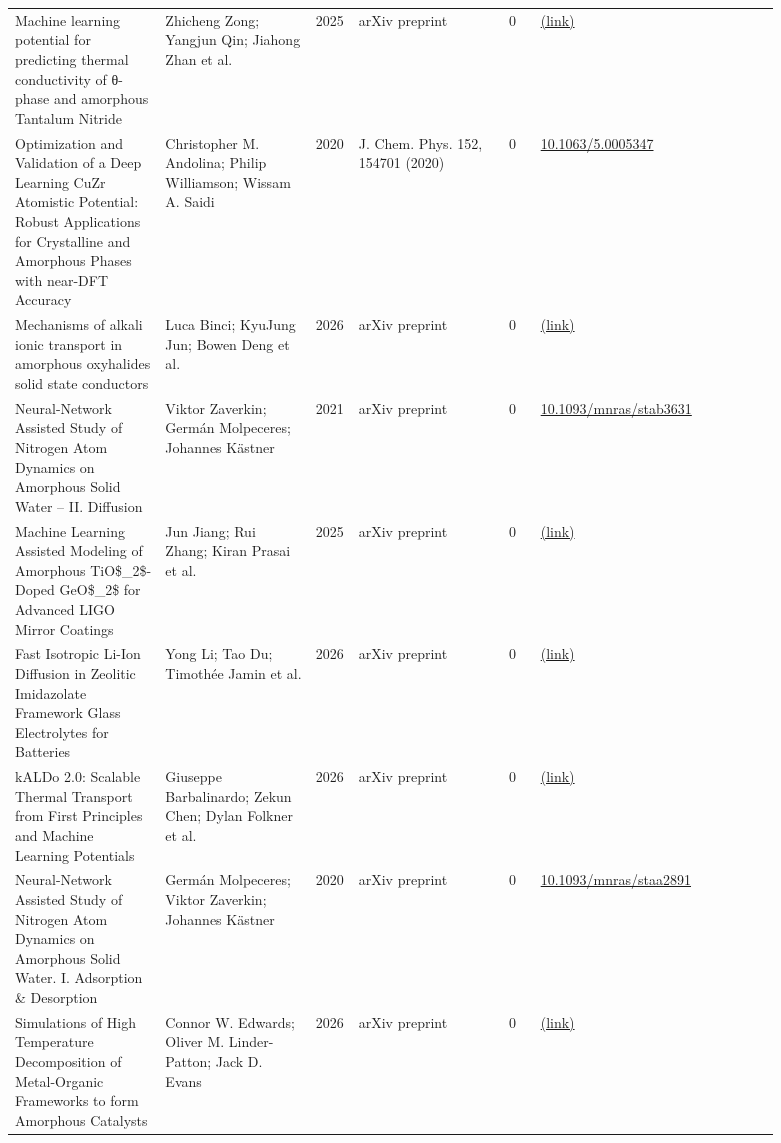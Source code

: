 \documentclass[10pt,a4paper]{article}
\begin{document}
{\begin{longtable}{p{0.192\linewidth}p{0.192\linewidth}p{0.043\linewidth}p{0.192\linewidth}p{0.043\linewidth}p{0.132\linewidth}p{0.096\linewidth}}
Machine learning potential for predicting thermal conductivity of θ-phase and amorphous Tantalum Nitride & Zhicheng Zong; Yangjun Qin; Jiahong Zhan et al. & 2025 & arXiv preprint & 0 & \href{http://arxiv.org/abs/2508.03297v1}{(link)} &  \\
Optimization and Validation of a Deep Learning CuZr Atomistic Potential: Robust Applications for Crystalline and Amorphous Phases with near-DFT Accuracy & Christopher M. Andolina; Philip Williamson; Wissam A. Saidi & 2020 & J. Chem. Phys. 152, 154701 (2020) & 0 & \href{https://doi.org/10.1063/5.0005347}{10.1063/5.0005347} &  \\
Mechanisms of alkali ionic transport in amorphous oxyhalides solid state conductors & Luca Binci; KyuJung Jun; Bowen Deng et al. & 2026 & arXiv preprint & 0 & \href{http://arxiv.org/abs/2601.06384v1}{(link)} &  \\
Neural-Network Assisted Study of Nitrogen Atom Dynamics on Amorphous Solid Water -- II. Diffusion & Viktor Zaverkin; Germán Molpeceres; Johannes Kästner & 2021 & arXiv preprint & 0 & \href{https://doi.org/10.1093/mnras/stab3631}{10.1093/mnras/stab3631} &  \\
Machine Learning Assisted Modeling of Amorphous TiO\$\_2\$-Doped GeO\$\_2\$ for Advanced LIGO Mirror Coatings & Jun Jiang; Rui Zhang; Kiran Prasai et al. & 2025 & arXiv preprint & 0 & \href{http://arxiv.org/abs/2503.21701v1}{(link)} &  \\
Fast Isotropic Li-Ion Diffusion in Zeolitic Imidazolate Framework Glass Electrolytes for Batteries & Yong Li; Tao Du; Timothée Jamin et al. & 2026 & arXiv preprint & 0 & \href{http://arxiv.org/abs/2608.06902v1}{(link)} &  \\
kALDo 2.0: Scalable Thermal Transport from First Principles and Machine Learning Potentials & Giuseppe Barbalinardo; Zekun Chen; Dylan Folkner et al. & 2026 & arXiv preprint & 0 & \href{http://arxiv.org/abs/2602.23728v2}{(link)} &  \\
Neural-Network Assisted Study of Nitrogen Atom Dynamics on Amorphous Solid Water. I. Adsorption \& Desorption & Germán Molpeceres; Viktor Zaverkin; Johannes Kästner & 2020 & arXiv preprint & 0 & \href{https://doi.org/10.1093/mnras/staa2891}{10.1093/mnras/staa2891} &  \\
Simulations of High Temperature Decomposition of Metal-Organic Frameworks to form Amorphous Catalysts & Connor W. Edwards; Oliver M. Linder-Patton; Jack D. Evans & 2026 & arXiv preprint & 0 & \href{http://arxiv.org/abs/2601.16459v1}{(link)} &  \\

\end{longtable}}
\end{document}
